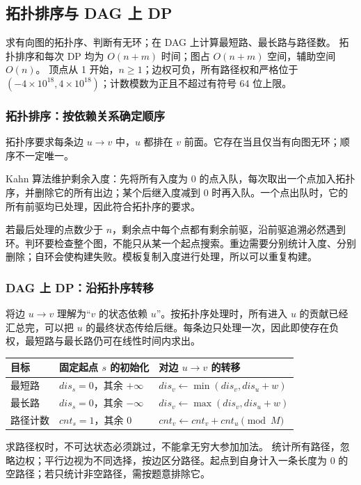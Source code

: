 \subsection{拓扑排序与 DAG 上 DP}
\label{algo:dag-dp}
\AlgorithmInfo
    {求有向图的拓扑序、判断有无环；在 DAG 上计算最短路、最长路与路径数。}
    {拓扑排序和每次 DP 均为 $O(n+m)$ 时间；图占 $O(n+m)$ 空间，辅助空间 $O(n)$。}
    {顶点从 1 开始，$n\ge1$；边权可负，所有路径权和严格位于 $(-4\times10^{18},4\times10^{18})$；计数模数为正且不超过有符号 64 位上限。}

\subsubsection*{拓扑排序：按依赖关系确定顺序}
拓扑序要求每条边 $u\to v$ 中，$u$ 都排在 $v$ 前面。它存在当且仅当有向图无环；顺序不一定唯一。

Kahn 算法维护剩余入度：先将所有入度为 0 的点入队，每次取出一个点加入拓扑序，并删除它的所有出边；某个后继入度减到 0 时再入队。一个点出队时，它的所有前驱均已处理，因此符合拓扑序的要求。

若最后处理的点数少于 $n$，剩余点中每个点都有剩余前驱，沿前驱追溯必然遇到环。判环要检查整个图，不能只从某一个起点搜索。重边需要分别统计入度、分别删除；自环会使构建失败。模板复制入度进行处理，所以可以重复构建。

\subsubsection*{DAG 上 DP：沿拓扑序转移}
将边 $u\to v$ 理解为“$v$ 的状态依赖 $u$”。按拓扑序处理时，所有进入 $u$ 的贡献已经汇总完，可以把 $u$ 的最终状态传给后继。每条边只处理一次，因此即使存在负权，最短路与最长路仍可在线性时间内求出。

\begin{center}
\small
\begin{tabularx}{\textwidth}{@{}lXX@{}}
\toprule
目标 & 固定起点 $s$ 的初始化 & 对边 $u\to v$ 的转移 \\
\midrule
最短路 & $dis_s=0$，其余 $+\infty$ & $dis_v\gets\min(dis_v,dis_u+w)$ \\
最长路 & $dis_s=0$，其余 $-\infty$ & $dis_v\gets\max(dis_v,dis_u+w)$ \\
路径计数 & $cnt_s=1$，其余 0 & $cnt_v\gets cnt_v+cnt_u\pmod M$ \\
\bottomrule
\end{tabularx}
\end{center}
求路径权时，不可达状态必须跳过，不能拿无穷大参加加法。 统计所有路径，忽略边权；平行边视为不同选择，按边区分路径。起点到自身计入一条长度为 0 的空路径；若只统计非空路径，需按题意排除它。

